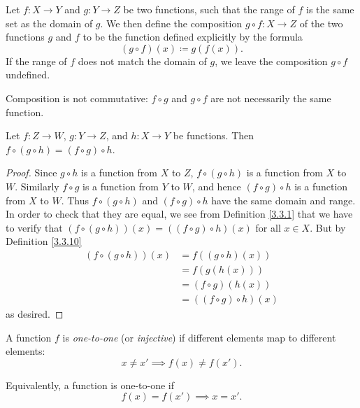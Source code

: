 \setcounter{theorem}{9}
\begin{definition}[Composition]\label{3.3.10}
Let \(f : X \to Y\) and \(g : Y \to Z\) be two functions, such that the range of \(f\) is the same set as the domain of \(g\).
We then define the composition \(g \circ f : X \to Z\) of the two functions \(g\) and \(f\) to be the function defined explicitly by the formula
\[
    (g \circ f)(x) \coloneqq g(f(x)).
\]
If the range of \(f\) does not match the domain of \(g\), we leave the composition \(g \circ f\) undefined.
\end{definition}

\begin{note}
Composition is not commutative: \(f \circ g\) and \(g \circ f\) are not necessarily the same function.
\end{note}

\setcounter{theorem}{11}
\begin{lemma}\label{3.3.12}
Let \(f : Z \to W\), \(g : Y \to Z\), and \(h : X \to Y\) be functions.
Then \(f \circ (g \circ h) = (f \circ g) \circ h\).
\end{lemma}

\begin{proof}
Since \(g \circ h\) is a function from \(X\) to \(Z\), \(f \circ (g \circ h)\) is a function from \(X\) to \(W\).
Similarly \(f \circ g\) is a function from \(Y\) to \(W\), and hence \((f \circ g) \circ h\) is a function from \(X\) to \(W\).
Thus \(f \circ (g \circ h)\) and \((f \circ g) \circ h\) have the same domain and range.
In order to check that they are equal, we see from Definition \ref{3.3.1} that we have to verify that \((f \circ (g \circ h))(x) = ((f \circ g) \circ h)(x)\) for all \(x \in X\).
But by Definition \ref{3.3.10}
    \begin{align*}
        (f \circ (g \circ h))(x)
        &= f((g \circ h)(x)) \\
        &= f(g(h(x))) \\
        &= (f \circ g)(h(x)) \\
        &= ((f \circ g) \circ h)(x)
    \end{align*}
as desired.
\end{proof}

\setcounter{theorem}{13}
\begin{definition}\label{3.3.14}
A function \(f\) is \emph{one-to-one} (or \emph{injective}) if different elements map to different elements:
\[
    x \neq x' \implies f(x) \neq f(x').
\]

Equivalently, a function is one-to-one if
\[
    f(x) = f(x') \implies x = x'.
\]
\end{definition}

